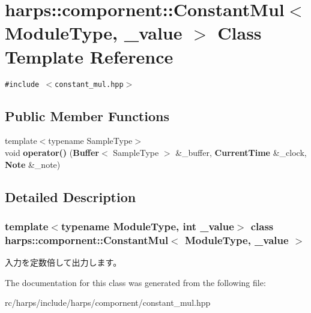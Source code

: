 \section{harps::compornent::ConstantMul$<$ ModuleType, \_\-value $>$ Class Template Reference}
\label{classharps_1_1compornent_1_1ConstantMul}
{\tt \#include $<$constant\_\-mul.hpp$>$}

\subsection*{Public Member Functions}
\begin{CompactItemize}
\item 
{\footnotesize template$<$typename SampleType$>$ }\\void \textbf{operator()} ({\bf Buffer}$<$ SampleType $>$ \&\_\-buffer, {\bf CurrentTime} \&\_\-clock, {\bf Note} \&\_\-note)\label{classharps_1_1compornent_1_1ConstantMul_9b7d2a43d400cb3e9378d3c3a661cc69}

\end{CompactItemize}


\subsection{Detailed Description}
\subsubsection*{template$<$typename ModuleType, int \_\-value$>$ class harps::compornent::ConstantMul$<$ ModuleType, \_\-value $>$}

入力を定数倍して出力します。 

The documentation for this class was generated from the following file:\begin{CompactItemize}
\item 
rc/harps/include/harps/compornent/constant\_\-mul.hpp\end{CompactItemize}
